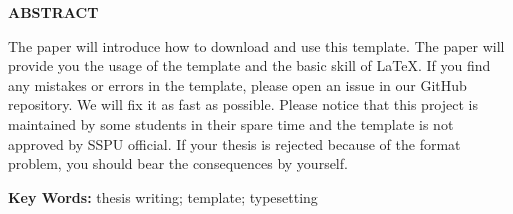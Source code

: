 \begin{center}
  \bfseries
  \abstractTitleEN
\end{center}

\begin{center}
  \bfseries
  ABSTRACT
\end{center}


The paper will introduce how to download and use this template.
The paper will provide you the usage of the template and the basic
skill of \LaTeX. If you find any mistakes or errors in the template,
please open an {\ttfamily issue} in our {\ttfamily GitHub} repository.
We will fix it as fast as possible. Please notice that this project is
maintained by some students in their spare time and the template is not
approved by SSPU official. If your thesis is rejected because of the format
problem, you should bear the consequences by yourself.

  {\noindent\bfseries Key Words: }
thesis writing; template; typesetting

\newpage
